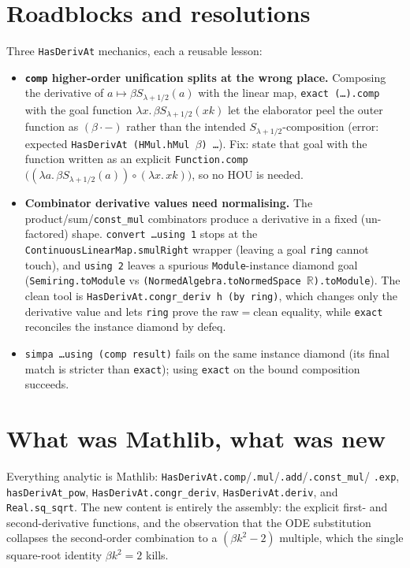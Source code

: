 \documentclass[11pt]{article}
\begin{document}
\section{Roadblocks and resolutions}
Three \texttt{HasDerivAt} mechanics, each a reusable lesson:
\begin{itemize}
\item \textbf{\texttt{comp} higher-order unification splits at the wrong place.} Composing the
derivative of $a\mapsto\beta S_{\lambda+1/2}(a)$ with the linear map, \texttt{exact (\ldots).comp} with
the goal function $\lambda x.\,\beta S_{\lambda+1/2}(xk)$ let the elaborator peel the outer function as
$(\beta\cdot-)$ rather than the intended $S_{\lambda+1/2}$-composition (error: expected
\texttt{HasDerivAt (HMul.hMul $\beta$) \ldots}). Fix: state that goal with the function written as an
explicit \texttt{Function.comp} $\bigl((\lambda a.\,\beta S_{\lambda+1/2}(a))\circ(\lambda x.\,xk)\bigr)$,
so no HOU is needed.
\item \textbf{Combinator derivative values need normalising.} The product/sum/\texttt{const\_mul}
combinators produce a derivative in a fixed (un-factored) shape. \texttt{convert \ldots using 1} stops
at the \texttt{ContinuousLinearMap.smulRight} wrapper (leaving a goal \texttt{ring} cannot touch), and
\texttt{using 2} leaves a spurious \texttt{Module}-instance diamond goal
(\texttt{Semiring.toModule} vs \texttt{(NormedAlgebra.toNormedSpace $\mathbb R$).toModule}). The clean
tool is \texttt{HasDerivAt.congr\_deriv h (by ring)}, which changes only the derivative value and lets
\texttt{ring} prove the raw$=$clean equality, while \texttt{exact} reconciles the instance diamond by
defeq.
\item \texttt{simpa \ldots using (comp result)} fails on the same instance diamond (its final match is
stricter than \texttt{exact}); using \texttt{exact} on the bound composition succeeds.
\end{itemize}

\section{What was Mathlib, what was new}
Everything analytic is Mathlib: \texttt{HasDerivAt.comp}/\texttt{.mul}/\texttt{.add}/\texttt{.const\_mul}/
\texttt{.exp}, \texttt{hasDerivAt\_pow}, \texttt{HasDerivAt.congr\_deriv}, \texttt{HasDerivAt.deriv}, and
\texttt{Real.sq\_sqrt}. The new content is entirely the assembly: the explicit first- and
second-derivative functions, and the observation that the ODE substitution collapses the second-order
combination to a $(\beta k^2-2)$ multiple, which the single square-root identity $\beta k^2=2$ kills.
\end{document}

